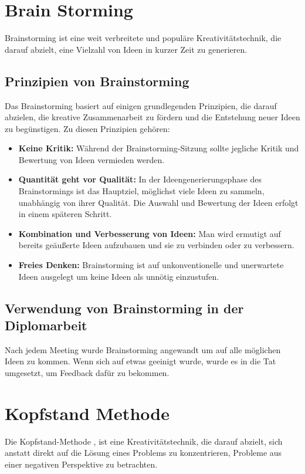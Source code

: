     \section{Brain Storming}

    Brainstorming \cite{Brainstorming} ist eine weit verbreitete und populäre Kreativitätstechnik, die darauf abzielt, eine Vielzahl von Ideen in kurzer Zeit zu generieren.

    \subsection{Prinzipien von Brainstorming}
    Das Brainstorming basiert auf einigen grundlegenden Prinzipien, die darauf abzielen, die kreative Zusammenarbeit zu fördern und die Entstehung neuer Ideen zu begünstigen. Zu diesen Prinzipien gehören:

    \begin{itemize}
        \item \textbf{Keine Kritik:} Während der Brainstorming-Sitzung sollte jegliche Kritik und Bewertung von Ideen vermieden werden.
        \item \textbf{Quantität geht vor Qualität:} In der Ideengenerierungsphase des Brainstormings ist das Hauptziel, möglichst viele Ideen zu sammeln, unabhängig von ihrer Qualität. Die Auswahl und Bewertung der Ideen erfolgt in einem späteren Schritt.
        \item \textbf{Kombination und Verbesserung von Ideen:} Man wird ermutigt auf bereits geäußerte Ideen aufzubauen und sie zu verbinden oder zu verbessern.
        \item \textbf{Freies Denken:} Brainstorming ist auf unkonventionelle und unerwartete Ideen ausgelegt um keine Ideen als unnötig einzustufen.
    \end{itemize}

    \subsection{Verwendung von Brainstorming in der Diplomarbeit}
    Nach jedem Meeting wurde Brainstorming angewandt um auf alle möglichen Ideen zu kommen. Wenn sich auf etwas geeinigt wurde, wurde es in die Tat umgesetzt, um Feedback dafür zu bekommen.

 \pagebreak

    \section{Kopfstand Methode}
    Die Kopfstand-Methode \cite{KopfstandMethode}, ist eine Kreativitätstechnik, die darauf abzielt, sich anstatt direkt auf die Lösung eines Problems zu konzentrieren,  Probleme aus einer negativen Perspektive zu betrachten.

